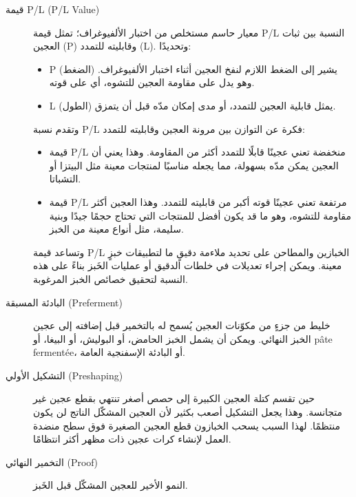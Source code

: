 \begin{description}
\item[قيمة \textenglish{P/L} \textenglish{(P/L Value)}]
معيار حاسم مستخلص من اختبار الألفيوغراف؛ تمثل قيمة \textenglish{P/L} النسبة بين ثبات العجين (\textenglish{P}) وقابليته للتمدد (\textenglish{L}). وتحديدًا:
\begin{itemize}
    \item[] \textenglish{P} (الضغط) يشير إلى الضغط اللازم لنفخ العجين أثناء اختبار الألفيوغراف. وهو يدل على مقاومة العجين للتشوه، أي على قوته.
    \item[] \textenglish{L} (الطول) يمثل قابلية العجين للتمدد، أو مدى إمكان مدّه قبل أن يتمزق.
\end{itemize}
وتقدم نسبة \textenglish{P/L} فكرة عن التوازن بين مرونة العجين وقابليته للتمدد:
\begin{itemize}
    \item[] قيمة \textenglish{P/L} منخفضة تعني عجينًا قابلًا للتمدد أكثر من المقاومة. وهذا يعني أن العجين يمكن مدّه بسهولة، مما يجعله مناسبًا لمنتجات معينة مثل البيتزا أو التشباتا.
    \item[] قيمة \textenglish{P/L} مرتفعة تعني عجينًا قوته أكبر من قابليته للتمدد. وهذا العجين أكثر مقاومة للتشوه، وهو ما قد يكون أفضل للمنتجات التي تحتاج حجمًا جيدًا وبنية سليمة، مثل أنواع معينة من الخبز.
\end{itemize}
وتساعد قيمة \textenglish{P/L} الخبازين والمطاحن على تحديد ملاءمة دقيقٍ ما لتطبيقات خبزٍ معينة. ويمكن إجراء تعديلات في خلطات الدقيق أو عمليات الخَبز بناءً على هذه النسبة لتحقيق خصائص الخبز المرغوبة.

\item[البادئة المسبقة \textenglish{(Preferment)}]
خليط من جزءٍ من مكوّنات العجين يُسمح له بالتخمير قبل إضافته إلى عجين الخبز النهائي. ويمكن أن يشمل الخبز الحامض، أو البوليش، أو البيغا، أو \textenglish{pâte fermentée}، أو البادئة الإسفنجية العامة.

\item[التشكيل الأولي \textenglish{(Preshaping)}]
حين تقسم كتلة العجين الكبيرة إلى حصص أصغر تنتهي بقطع عجين غير متجانسة. وهذا يجعل التشكيل أصعب بكثير لأن العجين المشكّل الناتج لن يكون منتظمًا. لهذا السبب يسحب الخبازون قطع العجين الصغيرة فوق سطح منضدة العمل لإنشاء كرات عجين ذات مظهر أكثر انتظامًا.

\item[التخمير النهائي \textenglish{(Proof)}]
النمو الأخير للعجين المشكّل قبل الخَبز.


\end{description}
